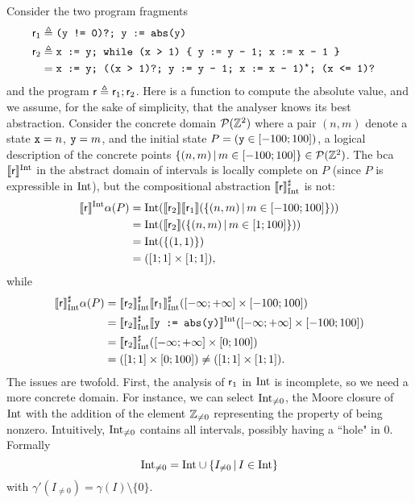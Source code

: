 \begin{example}\label{ex:lcla:refine-pre-usefulness}
	Consider the two program fragments
	\begin{align*}
		\mathsf{r}_1 & \triangleq \texttt{(y != 0)?; y := abs(y)}                                       \\
		\mathsf{r}_2 & \triangleq \texttt{x := y; while (x > 1) \{ y := y - 1; x := x - 1 \}}           \\
		        & = \texttt{x := y; ((x > 1)?; y := y - 1; x := x - 1)$^{\star}$; (x <= 1)? }
	\end{align*}
	and the program $\mathsf{r} \triangleq \mathsf{r}_1; \mathsf{r}_2$. Here  is a function to compute the absolute value, and we assume, for the sake of simplicity, that the analyser knows its best abstraction. Consider the concrete domain $\mathcal{P}(\mathbb{Z}^2)$ where a pair $(n, m)$ denote a state $\texttt{x} = n$, $\texttt{y} = m$, and the initial state $P = (\texttt{y} \in [-100; 100])$, a logical description of the concrete points $\{ (n, m) \,\vert\, m \in [-100; 100] \} \in \mathcal{P}(\mathbb{Z}^2)$.
	The bca $\llbracket\mathsf{r}\rrbracket^{\text{Int}}$ in the abstract domain of intervals is locally complete on $P$ (since $P$ is expressible in $\text{Int}$), but the compositional abstraction $\llbracket\mathsf{r}\rrbracket^{\sharp}_{\text{Int}}$ is not:
	\begin{align*}
		\llbracket\mathsf{r}\rrbracket^{\text{Int}} \alpha(P) & = \text{Int} (\llbracket\mathsf{r}_2\rrbracket \llbracket\mathsf{r}_1\rrbracket (\{ (n, m) \,\vert\, m \in [-100; 100] \})) \\
		                               & = \text{Int} (\llbracket\mathsf{r}_2\rrbracket (\{ (n, m) \,\vert\, m \in [1; 100] \}))                    \\
		                               & = \text{Int} (\{ (1, 1) \})                                                            \\
		                               & = ([1; 1] \times [1; 1]) ,
	\end{align*}
	while
	\begin{align*}
		\llbracket\mathsf{r}\rrbracket^{\sharp}_{\text{Int}} \alpha(P) & = \llbracket\mathsf{r}_2\rrbracket^{\sharp}_{\text{Int}} \llbracket\mathsf{r}_1\rrbracket^{\sharp}_{\text{Int}} ([-\infty; +\infty] \times [-100; 100])   \\
		                                        & = \llbracket\mathsf{r}_2\rrbracket^{\sharp}_{\text{Int}} \llbracket\texttt{y := abs(y)}\rrbracket^{\text{Int}} ([-\infty; +\infty] \times [-100; 100]) \\
		                                        & = \llbracket\mathsf{r}_2\rrbracket^{\sharp}_{\text{Int}} ([-\infty; +\infty] \times [0; 100])                                      \\
		                                        & = ([1; 1] \times [0; 100]) \neq ([1; 1] \times [1; 1]) .
	\end{align*}
	The issues are twofold.
	First, the analysis of $\mathsf{r}_1$ in $\text{Int}$ is incomplete, so we need a more concrete domain. For instance, we can select $\text{Int}_{\neq 0}$, the Moore closure of $\text{Int}$ with the addition of the element $\mathbb{Z}_{\neq 0}$ representing the property of being nonzero. Intuitively, $\text{Int}_{\neq 0}$ contains all intervals, possibly having a ``hole" in $0$. Formally
	\[
	\text{Int}_{\neq 0} = \text{Int} \cup \{ I_{\neq 0} \,\vert\, I \in \text{Int} \}
	\]
	with $\gamma'(I_{\neq 0 }) = \gamma(I) \setminus \{ 0 \}$.


\end{example}
